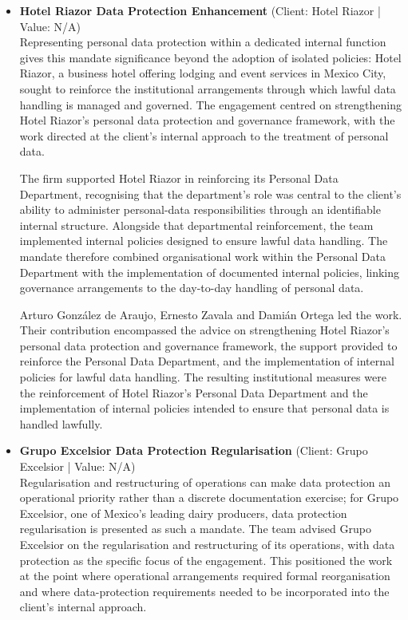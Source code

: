 \documentclass[11pt]{article}
\begin{document}
\begin{itemize}
The engagement resulted in the establishment of a dedicated Personal Data Protection Department, a concrete institutional outcome that strengthened internal controls and supported the reduction of regulatory exposure. The matter provides evidence of the team’s ability to help a client move from a general personal-data protection requirement to a dedicated department and a structured framework for its implementation.
\item \textbf{Hotel Riazor Data Protection Enhancement} (Client: Hotel Riazor | Value: N/A)\\ Representing personal data protection within a dedicated internal function gives this mandate significance beyond the adoption of isolated policies: Hotel Riazor, a business hotel offering lodging and event services in Mexico City, sought to reinforce the institutional arrangements through which lawful data handling is managed and governed. The engagement centred on strengthening Hotel Riazor’s personal data protection and governance framework, with the work directed at the client’s internal approach to the treatment of personal data.

The firm supported Hotel Riazor in reinforcing its Personal Data Department, recognising that the department’s role was central to the client’s ability to administer personal-data responsibilities through an identifiable internal structure. Alongside that departmental reinforcement, the team implemented internal policies designed to ensure lawful data handling. The mandate therefore combined organisational work within the Personal Data Department with the implementation of documented internal policies, linking governance arrangements to the day-to-day handling of personal data.

Arturo González de Araujo, Ernesto Zavala and Damián Ortega led the work. Their contribution encompassed the advice on strengthening Hotel Riazor’s personal data protection and governance framework, the support provided to reinforce the Personal Data Department, and the implementation of internal policies for lawful data handling. The resulting institutional measures were the reinforcement of Hotel Riazor’s Personal Data Department and the implementation of internal policies intended to ensure that personal data is handled lawfully.
\item \textbf{Grupo Excelsior Data Protection Regularisation} (Client: Grupo Excelsior | Value: N/A)\\ Regularisation and restructuring of operations can make data protection an operational priority rather than a discrete documentation exercise; for Grupo Excelsior, one of Mexico’s leading dairy producers, data protection regularisation is presented as such a mandate. The team advised Grupo Excelsior on the regularisation and restructuring of its operations, with data protection as the specific focus of the engagement. This positioned the work at the point where operational arrangements required formal reorganisation and where data-protection requirements needed to be incorporated into the client’s internal approach.


\end{itemize}
\end{document}
